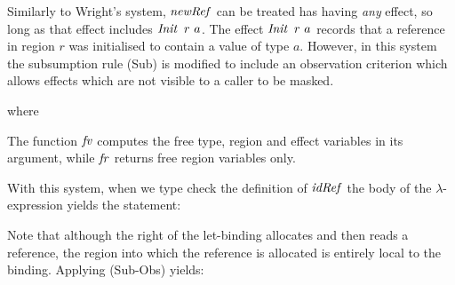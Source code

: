 
\medskip
Similarly to Wright's system, $\operatorname{\mathit{newRef}}$ can be treated has having \emph{any} effect, so long as that effect includes $\operatorname{\mathit{Init}} \ r \ a$. The effect $\operatorname{\mathit{Init}} \ r \ a$ records that a reference in region $r$ was initialised to contain a value of type $a$. However, in this system the subsumption rule (Sub) is modified to include an observation criterion which allows effects which are not visible to a caller to be masked.


where

\code{
	\mc{2}{$\iObserve(\Gamma, \tau, e)$} 
	\\[1ex]
 	& $= \{ \ \iInit \ r \ \tau_1, \ \iRead \ r \ \tau_1, \ \iWrite \ r \ \tau_1 \in \sigma \ 
 			| \ r \in \ifr(\Gamma) \cup \ifr(\tau) \ \}$ 
	\\[1ex]
 	& $\cup \ \{ \ \varsigma \in \sigma \ | \ \varsigma \in \ifv(\Gamma) \cup fv(\tau) \ \}$
}

The function $\operatorname{\mathit{fv}}$ computes the free type, region and effect variables in its argument, while $\operatorname{\mathit{fr}}$ returns free region variables only.

With this system, when we type check the definition of $\operatorname{\mathit{idRef}}$ the body of the $\lambda$-expression yields the statement:


Note that although the right of the let-binding allocates and then reads a reference, the region into which the reference is allocated is entirely local to the binding. Applying (Sub-Obs) yields:


